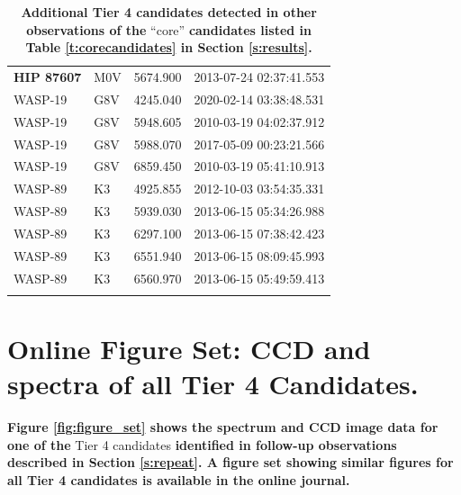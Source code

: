 \documentclass[linenumbers]{aastex701}
\providecommand{\DIFadd}[1]{{\bf #1}} %
\providecommand{\DIFaddbegin}{} %
\providecommand{\DIFaddend}{} %
\begin{document}
\begin{longtable}{|l|l|l|c|}
 \DIFaddbegin \DIFadd{HIP 87607 }\DIFaddend & M0V & 5674.900 & 2013-07-24 02:37:41.553 \\
WASP-19 & G8V & 4245.040 & 2020-02-14 03:38:48.531 \\
WASP-19 & G8V & 5948.605 & 2010-03-19 04:02:37.912 \\
WASP-19 & G8V & 5988.070 & 2017-05-09 00:23:21.566 \\
WASP-19 & G8V & 6859.450 & 2010-03-19 05:41:10.913 \\
WASP-89 & K3 & 4925.855 & 2012-10-03 03:54:35.331 \\
WASP-89 & K3 & 5939.030 & 2013-06-15 05:34:26.988 \\
WASP-89 & K3 & 6297.100 & 2013-06-15 07:38:42.423 \\
WASP-89 & K3 & 6551.940 & 2013-06-15 08:09:45.993 \\
WASP-89 & K3 & 6560.970 & 2013-06-15 05:49:59.413 \\
\hline
\DIFaddbegin \caption{\DIFadd{Additional Tier 4 candidates detected in other observations of the }\enquote{core} \DIFadd{candidates listed in Table \ref{t:corecandidates} in Section \ref{s:results}.}} \label{t:tier4additional} \\
\DIFaddend \end{longtable}
\onecolumngrid
\DIFaddbegin \clearpage
\DIFaddend 

 \DIFaddbegin \section{\DIFadd{Online Figure Set: CCD and spectra of all Tier 4 Candidates.}}
\label{s:figure_set}
\DIFadd{Figure \ref{fig:figure_set} shows the spectrum and CCD image data for one of the }\DIFaddend Tier 4 candidates  \DIFaddbegin \DIFadd{identified in follow-up observations described in Section \ref{s:repeat}.  A figure set showing similar figures for all Tier 4 candidates is available in the online journal.
}
\end{document}
